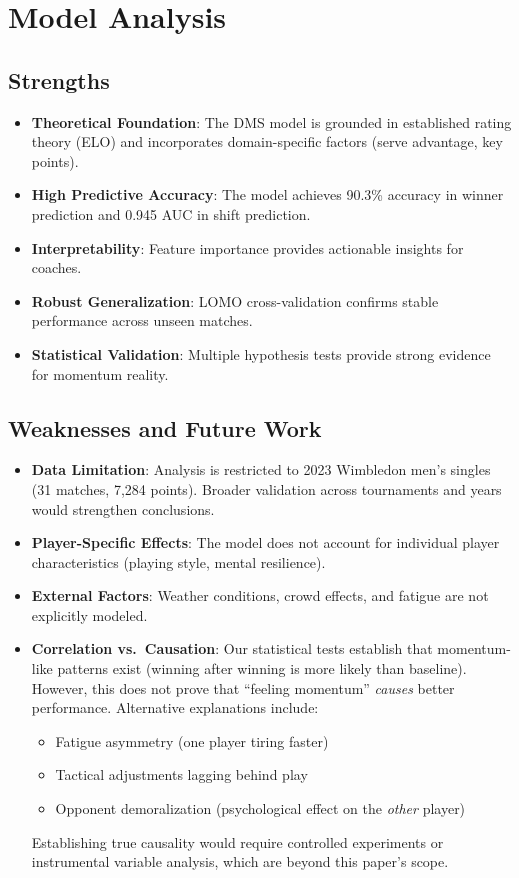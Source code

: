 \documentclass{mcmthesis}
\begin{document}
\section{Model Analysis}

\subsection{Strengths}

\begin{itemize}
    \item \textbf{Theoretical Foundation}: The DMS model is grounded in established rating theory (ELO) and incorporates domain-specific factors (serve advantage, key points).
    \item \textbf{High Predictive Accuracy}: The model achieves 90.3\% accuracy in winner prediction and 0.945 AUC in shift prediction.
    \item \textbf{Interpretability}: Feature importance provides actionable insights for coaches.
    \item \textbf{Robust Generalization}: LOMO cross-validation confirms stable performance across unseen matches.
    \item \textbf{Statistical Validation}: Multiple hypothesis tests provide strong evidence for momentum reality.
\end{itemize}

\subsection{Weaknesses and Future Work}

\begin{itemize}
    \item \textbf{Data Limitation}: Analysis is restricted to 2023 Wimbledon men's singles (31 matches, 7,284 points). Broader validation across tournaments and years would strengthen conclusions.
    \item \textbf{Player-Specific Effects}: The model does not account for individual player characteristics (playing style, mental resilience).
    \item \textbf{External Factors}: Weather conditions, crowd effects, and fatigue are not explicitly modeled.
    \item \textbf{Correlation vs.\ Causation}: Our statistical tests establish that momentum-like patterns exist (winning after winning is more likely than baseline). However, this does not prove that ``feeling momentum'' \emph{causes} better performance. Alternative explanations include:
    \begin{itemize}
        \item Fatigue asymmetry (one player tiring faster)
        \item Tactical adjustments lagging behind play
        \item Opponent demoralization (psychological effect on the \emph{other} player)
    \end{itemize}
    Establishing true causality would require controlled experiments or instrumental variable analysis, which are beyond this paper's scope.
\end{itemize}
\end{document}
